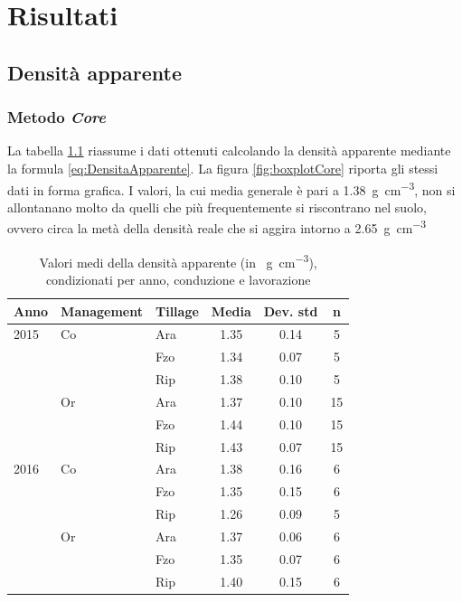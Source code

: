 \documentclass[11pt, a4paper, openright, titlepage, final, language = italian]{book}
\begin{document}
\chapter{Risultati}
\section{Densit\`a apparente}


\subsection{Metodo \emph{Core}}

La tabella \ref{tab:riassunto_1} riassume i dati ottenuti calcolando
la densit\`a apparente mediante la formula
\ref{eq:DensitaApparente}. La figura \ref{fig:boxplotCore} riporta gli
stessi dati in forma grafica. I valori, la cui media generale \`e pari a
\SI{1.38}{\gram\per\cubic\centi\metre}, 
non si allontanano
molto da quelli che pi\`u frequentemente si riscontrano nel suolo,
ovvero circa la met\`a della densit\`a reale che si aggira intorno a
\SI{2.65}{\gram\per\cubic\centi\metre}


\begin{table}[hb]
\centering
\caption{Valori medi della densit\`a apparente (in \SI{}{\gram\per\cubic\centi\metre}), condizionati per anno, conduzione e lavorazione } 
\label{tab:riassunto_1}
\begin{tabular}{lllccc}
  \hline
Anno & Management & Tillage & Media & Dev. std & n \\ 
  \hline
2015 & Co & Ara & 1.35 & 0.14 &   5 \\ 
    &   & Fzo & 1.34 & 0.07 &   5 \\ 
    &   & Rip & 1.38 & 0.10 &   5 \\ 
    & Or & Ara & 1.37 & 0.10 &  15 \\ 
    &   & Fzo & 1.44 & 0.10 &  15 \\ 
    &   & Rip & 1.43 & 0.07 &  15 \\ 
  2016 & Co & Ara & 1.38 & 0.16 &   6 \\ 
    &   & Fzo & 1.35 & 0.15 &   6 \\ 
    &   & Rip & 1.26 & 0.09 &   5 \\ 
    & Or & Ara & 1.37 & 0.06 &   6 \\ 
    &   & Fzo & 1.35 & 0.07 &   6 \\ 
    &   & Rip & 1.40 & 0.15 &   6 \\ 
   \hline
\end{tabular}
\end{table} \FloatBarrier
\end{document}
